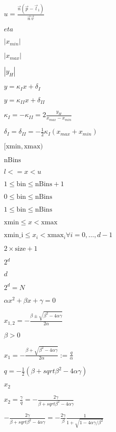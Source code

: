 \documentclass{article}
\begin{document}
$ u = \frac{\vec n (\vec p - \vec l_{1})}{\vec n \vec v}$
\pagebreak

$ eta $
\pagebreak

$ |x_{min}| $
\pagebreak

$ | x_{max} | $
\pagebreak

$ | y_{H} | $
\pagebreak

$ y = \kappa_{I} x + \delta_{I} $
\pagebreak

$ y = \kappa_{II} x + \delta_{II} $
\pagebreak

$ \kappa_{I} = - \kappa_{II} = 2 \frac{y_{H}}{x_{max} - x_{min}} $
\pagebreak

$ \delta_{I} = \delta_{II} = - \frac{1}{2}\kappa_{I}(x_{max} + x_{min}) $
\pagebreak

$[\text{xmin},\text{xmax})$
\pagebreak

$\text{nBins}$
\pagebreak

$l <= x < u$
\pagebreak

$1 \le \text{bin} \le \text{nBins} + 1$
\pagebreak

$0 \le \text{bin} \le \text{nBins}$
\pagebreak

$1 \le \text{bin} \le \text{nBins}$
\pagebreak

$\text{xmin} \le x < \text{xmax}$
\pagebreak

$\text{xmin_i} \le x_i < \text{xmax}_i \forall i=0, \dots, d-1$
\pagebreak

$2 \times \text{size}+1$
\pagebreak

$2^d$
\pagebreak

$d$
\pagebreak

$2^d = N $
\pagebreak

$ \alpha x^{2} + \beta x + \gamma = 0 $
\pagebreak

$ x_{1, 2} = - \frac{\beta \pm \sqrt{\beta^{2}-4\alpha\gamma}}{2\alpha}$
\pagebreak

$ \beta > 0 $
\pagebreak

$ x_{1} = - \frac{\beta + \sqrt{\beta^{2}-4\alpha\gamma}}{2\alpha} := \frac{q}{\alpha}$
\pagebreak

$ q= -\frac{1}{2}(\beta+sqrt{\beta^{2}-4\alpha\gamma})$
\pagebreak

$ x_{2} $
\pagebreak

$ x_{2} = \frac{\gamma}{q} = -\frac{2\gamma}{\beta+sqrt{\beta^{2}-4\alpha\gamma}}$
\pagebreak

$ -\frac{2\gamma}{\beta+sqrt{\beta^{2}-4\alpha\gamma}} = -\frac{2\gamma}{\beta}\frac{1}{1+\sqrt{1-4\alpha\gamma/\beta^{2}}}$
\pagebreak
\end{document}
